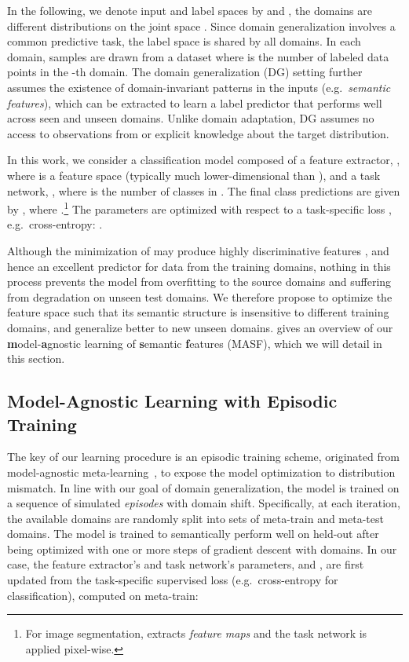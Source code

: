 \documentclass{article}
\begin{document}
In the following, we denote input and label spaces by  and , the domains  are different distributions on the joint space . Since domain generalization involves a common predictive task, the label space is shared by all domains.
In each domain, samples are drawn from a dataset  where  is the number of labeled data points in the -th domain.
The domain generalization (DG) setting further assumes the existence of domain-invariant patterns in the inputs (e.g.\ \emph{semantic features}), which can be extracted to learn a label predictor that performs well across seen and unseen domains. Unlike domain adaptation, DG assumes no access to observations from or explicit knowledge about the target distribution.

In this work, we consider a classification model composed of a feature extractor, , where  is a feature space (typically much lower-dimensional than ), and a task network, , where  is the number of classes in . The final class predictions are given by , where  .\footnote{For image segmentation,  extracts \emph{feature maps} and the task network  is applied pixel-wise.}
The parameters  are optimized with respect to a task-specific loss , e.g.\ cross-entropy: .

Although the minimization of  may produce highly discriminative features , and hence an excellent predictor for data from the training domains, nothing in this process prevents the model from overfitting to the source domains and suffering from degradation on unseen test domains. We therefore propose to optimize the feature space such that its semantic structure is insensitive to different training domains, and generalize better to new unseen domains. 
 gives an overview of our
\textbf{m}odel-\textbf{a}gnostic learning of \textbf{s}emantic \textbf{f}eatures (MASF),
which we will detail in this section.


\subsection{Model-Agnostic Learning with Episodic Training}


The key of our learning procedure is an episodic training scheme, originated from model-agnostic meta-learning~\citep{finn2017model}, to expose the model optimization to distribution mismatch.
In line with our goal of domain generalization, the model is trained on a sequence of simulated \emph{episodes} with domain shift. 
Specifically, at each iteration, the available domains  are randomly split into sets of meta-train  and meta-test  domains.
The model is trained to semantically perform well on held-out  after being optimized with one or more steps of gradient descent with  domains.
In our case, the feature extractor's and task network's parameters,  and , are first updated from the task-specific supervised loss  (e.g.\ cross-entropy for classification), computed on meta-train: 
\end{document}
